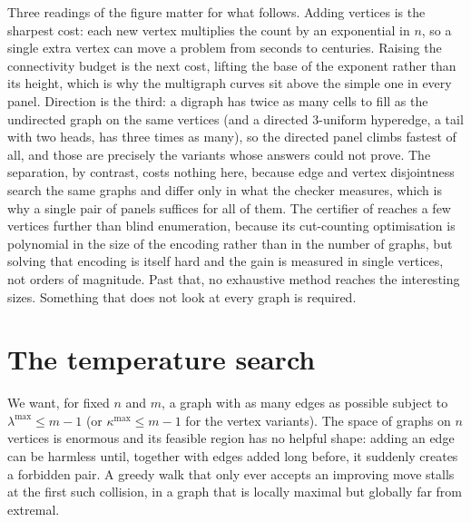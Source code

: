 Three readings of the figure matter for what follows. Adding vertices is the sharpest cost: each new vertex multiplies the count by an exponential in $n$, so a single extra vertex can move a problem from seconds to centuries. Raising the connectivity budget is the next cost, lifting the base of the exponent rather than its height, which is why the multigraph curves sit above the simple one in every panel. Direction is the third: a digraph has twice as many cells to fill as the undirected graph on the same vertices (and a directed $3$-uniform hyperedge, a tail with two heads, has three times as many), so the directed panel climbs fastest of all, and those are precisely the variants whose answers  could not prove. The separation, by contrast, costs nothing here, because edge and vertex disjointness search the same graphs and differ only in what the checker measures, which is why a single pair of panels suffices for all of them. The certifier of  reaches a few vertices further than blind enumeration, because its cut-counting optimisation is polynomial in the size of the encoding rather than in the number of graphs, but solving that encoding is itself hard and the gain is measured in single vertices, not orders of magnitude. Past that, no exhaustive method reaches the interesting sizes. Something that does not look at every graph is required.

\section{The temperature search}

We want, for fixed $n$ and $m$, a graph with as many edges as possible subject to $\lambda^{\max} \le m - 1$ (or $\kappa^{\max} \le m - 1$ for the vertex variants). The space of graphs on $n$ vertices is enormous and its feasible region has no helpful shape: adding an edge can be harmless until, together with edges added long before, it suddenly creates a forbidden pair. A greedy walk that only ever accepts an improving move stalls at the first such collision, in a graph that is locally maximal but globally far from extremal.

